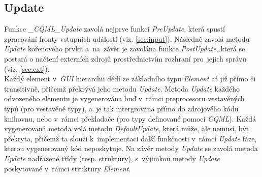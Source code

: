 \documentclass[11pt,twoside,a4paper]{book}
\begin{document}
\subsection{Update}
Funkce\textit{ \_CQML\_Update} zavolá nejprve funkci \textit{PreUpdate}, která spustí zpracování fronty vstupních událostí (viz. \ref{sec:input}). Následně zavolá metodu \textit{Update} kořenového prvku a~na~závěr je zavolána funkce \textit{PostUpdate}, která se postará o načtení externích zdrojů prostřednictvím rozhraní pro~jejich správu (viz. \ref{sec:ext}).\\
Každý element v~\textit{GUI} hierarchii dědí ze základního typu \textit{Element} ať již přímo či transitivně, přičemž překrývá jeho metodu \textit{Update}. Metoda \textit{Update} každého odvozeného elementu je vygenerována buď v~rámci preprocesoru vestavěných typů (pro vestavěné typy), a~je tak intergrována přímo do zdrojového kódu knihovnu, nebo v~rámci překladače (pro typy definované pomocí \textit{CQML}). Každá vygenerovaná metoda volá metodu \textit{DefaultUpdate}, která může, ale nemusí, být překryta, přičemž ta slouží k~implementaci další funkčnosti v~rámci \textit{Update} fáze, kterou vygenerovaný kód neposkytuje. Na závěr metody \textit{Update} se zavolá metoda \textit{Update} nadřazené třídy (resp. struktury), s~výjimkou metody \textit{Update} poskytované v~rámci struktury \textit{Element}.\\
\end{document}
